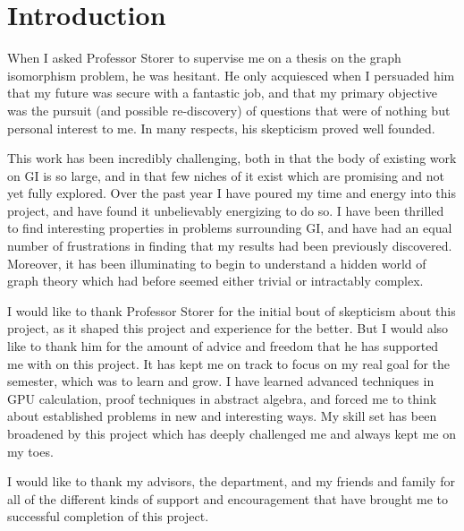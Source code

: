 \chapter*{Introduction}

When I asked Professor Storer to supervise me on a thesis on the graph isomorphism problem, he was hesitant.
He only acquiesced when I persuaded him that my future was secure with a fantastic job, and that my primary objective was the pursuit (and possible re-discovery) of questions that were of nothing but personal interest to me.
In many respects, his skepticism proved well founded.

This work has been incredibly challenging, both in that the body of existing work on GI is so large, and in that few niches of it exist which are promising and not yet fully explored.
Over the past year I have poured my time and energy into this project, and have found it unbelievably energizing to do so.
I have been thrilled to find interesting properties in problems surrounding GI, and have had an equal number of frustrations in finding that my results had been previously discovered.
Moreover, it has been illuminating to begin to understand a hidden world of graph theory which had before seemed either trivial or intractably complex.

I would like to thank Professor Storer for the initial bout of skepticism about this project, as it shaped this project and experience for the better.
But I would also like to thank him for the amount of advice and freedom that he has supported me with on this project.
It has kept me on track to focus on my real goal for the semester, which was to learn and grow.
I have learned advanced techniques in GPU calculation, proof techniques in abstract algebra, and forced me to think about established problems in new and interesting ways.
My skill set has been broadened by this project which has deeply challenged me and always kept me on my toes.

I would like to thank my advisors, the department, and my friends and family for all of the different kinds of support and encouragement that have brought me to successful completion of this project.